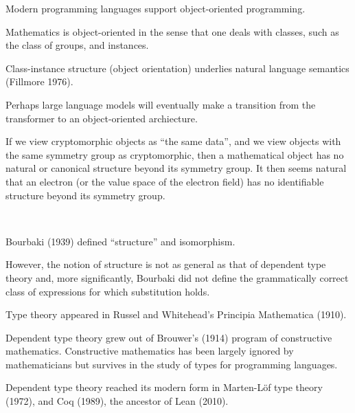 {
Modern programming languages support object-oriented programming.

\vfill
Mathematics is object-oriented in the sense that one deals with classes, such as the class of groups, and instances.

\vfill
Class-instance structure (object orientation) underlies natural language semantics (Fillmore 1976).

\vfill
Perhaps large language models will eventually make a transition from the transformer to an object-oriented archiecture.



If we view cryptomorphic objects as ``the same data'', and we view objects with the same symmetry group as cryptomorphic,
then a mathematical object has no natural or canonical structure beyond its symmetry group.
It then seems natural that an electron (or the value space of the electron field) has no identifiable structure
beyond its symmetry group.




\vspace{-.5in}
~ \hfill\unnamed
    {
    }{
      }
\hfill ~


}




Bourbaki (1939) defined ``structure'' and isomorphism.

\vfill
However, the notion of structure is not as general as that of dependent type theory and,
more significantly, Bourbaki did not define the grammatically correct class of expressions for which substitution holds.


Type theory appeared in Russel and Whitehead's Principia Mathematica (1910).

\vfill
Dependent type theory grew out of Brouwer's (1914) program of constructive mathematics.
Constructive mathematics has been largely ignored by mathematicians
but survives in the study of types for programming languages.

\vfill
Dependent type theory reached its modern form in Marten-L\"{o}f type theory (1972),
and Coq (1989), the ancestor of Lean (2010).

